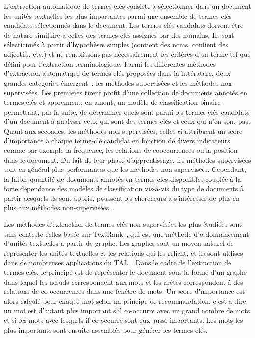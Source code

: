   L'extraction automatique de termes-clés consiste à sélectionner dans un
  document les unités textuelles les plus importantes parmi une ensemble de
  termes-clés candidats sélectionnés dans le document. Les termes-clés candidats
  doivent être de nature similaire à celles des termes-clés assignés par des
  humains. Ils sont sélectionnés à partir d'hypothèses simples (contient des
  noms, contient des adjectifs, etc.) et ne remplissent pas nécessairement les
  critères d'un terme tel que défini pour l'extraction terminologique. Parmi les
  différentes méthodes d'extraction automatique de termes-clés proposées dans la
  littérature, deux grandes catégories émergent~: les méthodes supervisées et
  les méthodes non-supervisées. Les premières tirent profit d'une collection de
  documents annotés en termes-clés et apprennent, en amont, un modèle de
  classification binaire permettant, par la suite, de déterminer quels sont
  parmi les termes-clés candidats d'un document à analyser ceux qui sont des
  termes-clés et ceux qui n'en sont pas. Quant aux secondes, les méthodes
  non-supervisées, celles-ci attribuent un score d'importance à chaque terme-clé
  candidat en fonction de divers indicateurs comme par exemple la fréquence, les
  relations de cooccurrences ou la position dans le document. Du fait de leur
  phase d'apprentissage, les méthodes supervisées sont en général plus
  performantes que les méthodes non-supervisées. Cependant, la faible quantité
  de documents annotés en termes-clés disponibles couplée à la forte dépendance
  des modèles de classification vis-à-vis du type de documents à partir desquels
  ils sont appris, poussent les chercheurs à s'intéresser de plus en plus aux
  méthodes non-supervisées~\cite{hassan2010conundrums}.

  Les méthodes d'extraction de termes-clés non-supervisées les plus étudiées
  sont sans conteste celles basée sur TextRank~\cite{mihalcea2004textrank}, qui
  est une méthode d'ordonnancement d'unités textuelles à partir de graphe. Les
  graphes sont un moyen naturel de représenter les unités textuelles et les
  relations qui les relient, et ils sont utilisés dans de nombreuses
  applications du TAL~\cite{kozareva2013textgraphs}. Dans le cadre de
  l'extraction de termes-clés, le principe est de représenter le document sous
  la forme d'un graphe dans lequel les n\oe{}uds correspondent aux mots et les
  arêtes correspondent à des relations de co-occurrences dans une fenêtre de
  mots. Un score d'importance est alors calculé pour chaque mot selon un
  principe de recommandation, c'est-à-dire un mot est d'autant plus important
  s'il co-occurre avec un grand nombre de mots et si les mots avec lesquels il
  co-occurre sont eux aussi importants. Les mots les plus importants sont
  ensuite assemblés pour générer les termes-clés.


